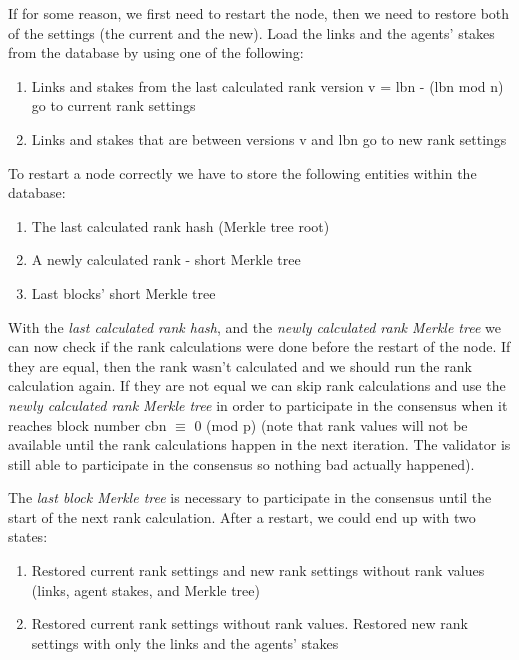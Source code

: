 \documentclass[8pt,oneside]{amsart}
\newcommand{\code}[1]{{\PlayBold #1}}
\begin{document}
\begin{Abstract}
If for some reason, we first need to restart the node, then we need to restore both of the settings (the current and the new).
Load the links and the agents' stakes from the database by using one of the following:

\begin{enumerate}
  \item Links and stakes from the last calculated rank version \code{v = lbn - (lbn mod n)} go to current rank settings
  \item Links and stakes that are between versions \code{v} and \code{lbn} go to new rank settings
\end{enumerate}

To restart a node correctly we have to store the following entities within the database:

\begin{enumerate}
  \item The last calculated rank hash (Merkle tree root)
  \item A newly calculated rank - short Merkle tree
  \item Last blocks' short Merkle tree
\end{enumerate}

With the \textit{last calculated rank hash}, and the \textit{newly calculated rank Merkle tree} we can now check if the rank
calculations were done before the restart of the node. If they are equal, then the rank wasn't calculated and we should run the rank calculation again.
If they are not equal we can skip rank calculations and use the \textit{newly calculated rank Merkle tree} in order to participate in the consensus when it reaches block number \code{cbn $\equiv$ 0 (mod p)} (note that rank values will not be available until the rank calculations happen in the next iteration. The validator is still able to participate in the consensus so nothing bad actually happened).

The \textit{last block Merkle tree} is necessary to participate in the consensus until the start of the next rank calculation. After a restart, we could end up with two states:

\begin{enumerate}
\item Restored current rank settings and new rank settings without rank values (links, agent stakes, and Merkle tree)
\item Restored current rank settings without rank values. Restored new rank settings with only the links and the agents' stakes
\end{enumerate}


\end{Abstract}
\end{document}
